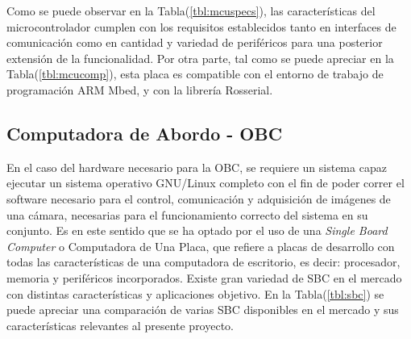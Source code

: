     Como se puede observar en la Tabla(\ref{tbl:mcuspecs}), las características del microcontrolador cumplen con los requisitos establecidos tanto en interfaces 
    de comunicación como en cantidad y variedad de periféricos para una posterior extensión de la funcionalidad. Por otra parte, 
    tal como se puede apreciar en la Tabla(\ref{tbl:mcucomp}), esta placa es compatible con el entorno de trabajo de programación 
    ARM Mbed, y con la librería Rosserial.

    \subsection{Computadora de Abordo - OBC}

    En el caso del hardware necesario para la OBC, se requiere un sistema capaz ejecutar un sistema operativo GNU/Linux completo 
    con el fin de poder correr el software necesario para el control, comunicación y adquisición de imágenes de una cámara, necesarias
    para el funcionamiento correcto del sistema en su conjunto. Es en este sentido que se ha optado por el uso de una \textit{Single Board Computer}
    o Computadora de Una Placa, que refiere a placas de desarrollo con todas las características de una computadora de escritorio, es decir:
    procesador, memoria y periféricos incorporados. Existe gran variedad de SBC en el mercado con distintas características y aplicaciones 
    objetivo. En la Tabla(\ref{tbl:sbc}) se puede apreciar una comparación de varias SBC disponibles en el mercado y sus características 
    relevantes al presente proyecto.


